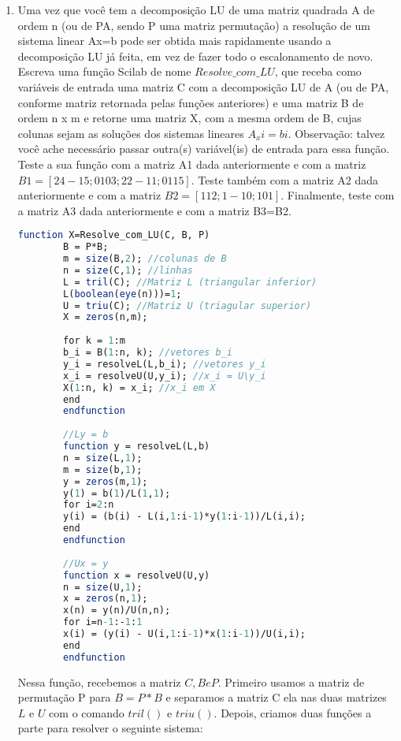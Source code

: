 \documentclass[leqno]{article}
\numberwithin{equation}{section}
\begin{document}
\begin{enumerate}
\begin{sol}
\end{sol}


\item Uma vez que você tem a decomposição LU de uma matriz quadrada A de
ordem n (ou de PA, sendo P uma matriz permutação) a resolução de um
sistema linear Ax=b pode ser obtida mais rapidamente usando a
decomposição LU já feita, em vez de fazer todo o escalonamento de novo.
Escreva uma função Scilab de nome $Resolve\_com\_LU$, que receba como
variáveis de entrada uma matriz C com a decomposição LU de A (ou de PA,
conforme matriz retornada pelas funções anteriores) e uma matriz B de
ordem n x m e retorne uma matriz X, com a mesma ordem de B, cujas
colunas sejam as soluções dos sistemas lineares $A_xi=bi$.
Observação: talvez você ache necessário passar outra(s) variável(is) de
entrada para essa função.
Teste a sua função com a matriz A1 dada anteriormente e com a matriz
$B1=[2 4 -1 5 ;0 1 0 3 ; 2 2 -1 1 ; 0 1 1 5 ]$. Teste também com a matriz A2
dada anteriormente e com a matriz $B2=[1 1 2; 1 -1 0; 1 0 1]$. Finalmente, teste
com a matriz A3 dada anteriormente e com a matriz B3=B2.


\begin{sol}
	\begin{lstlisting}[language=Scilab]
		function X=Resolve_com_LU(C, B, P)
		B = P*B;
		m = size(B,2); //colunas de B
		n = size(C,1); //linhas
		L = tril(C); //Matriz L (triangular inferior)
		L(boolean(eye(n)))=1;
		U = triu(C); //Matriz U (triagular superior)
		X = zeros(n,m);
		
		for k = 1:m
		b_i = B(1:n, k); //vetores b_i
		y_i = resolveL(L,b_i); //vetores y_i
		x_i = resolveU(U,y_i); //x_i = U\y_i
		X(1:n, k) = x_i; //x_i em X
		end
		endfunction
		
		//Ly = b
		function y = resolveL(L,b)
		n = size(L,1);
		m = size(b,1);
		y = zeros(m,1);
		y(1) = b(1)/L(1,1);
		for i=2:n
		y(i) = (b(i) - L(i,1:i-1)*y(1:i-1))/L(i,i);
		end
		endfunction
		
		//Ux = y
		function x = resolveU(U,y)
		n = size(U,1);
		x = zeros(n,1);
		x(n) = y(n)/U(n,n);
		for i=n-1:-1:1
		x(i) = (y(i) - U(i,1:i-1)*x(1:i-1))/U(i,i);
		end
		endfunction
	\end{lstlisting}

Nessa função, recebemos a matriz $C, B e P$. Primeiro usamos a matriz de permutação P para $B = P * B$ e separamos a matriz C ela nas duas matrizes $L$ e $U$ com o comando $tril()$ e $triu()$. Depois, criamos duas funções a parte para resolver o seguinte sistema:


\end{sol}
\end{enumerate}
\end{document}
